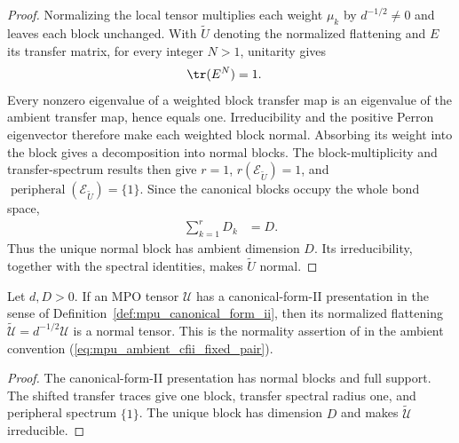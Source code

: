 \begin{proof}\leanok
    Normalizing the local tensor multiplies each weight $\mu_k$ by
    $d^{-1/2}\ne0$ and leaves each block unchanged. With $\widetilde U$
    denoting the normalized flattening and $E$ its transfer matrix, for every
    integer $N>1$, unitarity gives
    \begin{align}
        \tr(E^N) & =1.
    \end{align}
    Every nonzero eigenvalue of a weighted block transfer map is an eigenvalue
    of the ambient transfer map, hence equals one. Irreducibility and the
    positive Perron eigenvector therefore make each weighted block normal.
    Absorbing its weight into the block gives a decomposition into normal
    blocks. The block-multiplicity and transfer-spectrum results then give $r=1$,
    $r(\mathcal E_{\widetilde U})=1$, and
    $\operatorname{peripheral}(\mathcal E_{\widetilde U})=\{1\}$.
    Since the canonical blocks occupy the whole bond space,
    \begin{align}
        \sum_{k=1}^{r}D_k & =D.
    \end{align}
    Thus the unique normal block has ambient dimension $D$. Its irreducibility,
    together with the spectral identities, makes $\widetilde U$
    normal.
\end{proof}

\begin{lemma}
    \label{thm:mpu_canonical_form_ii_normal}
    \leanok
    Let $d,D>0$. If an MPO tensor $\mathcal U$ has a canonical-form-II
    presentation in the sense of
    Definition~\ref{def:mpu_canonical_form_ii}, then its normalized flattening
    $\widetilde{\mathcal U}=d^{-1/2}\mathcal U$ is a normal tensor.
    This is the normality assertion of
    \cite[Proposition~III.1]{Cirac2017MPU} in the ambient convention
    (\ref{eq:mpu_ambient_cfii_fixed_pair}).
\end{lemma}

\begin{proof}\leanok
    The canonical-form-II presentation has normal blocks and full support.
    The shifted transfer traces give one block, transfer spectral radius one,
    and peripheral spectrum $\{1\}$. The unique block has dimension $D$ and
    makes $\widetilde{\mathcal U}$ irreducible.
\end{proof}

